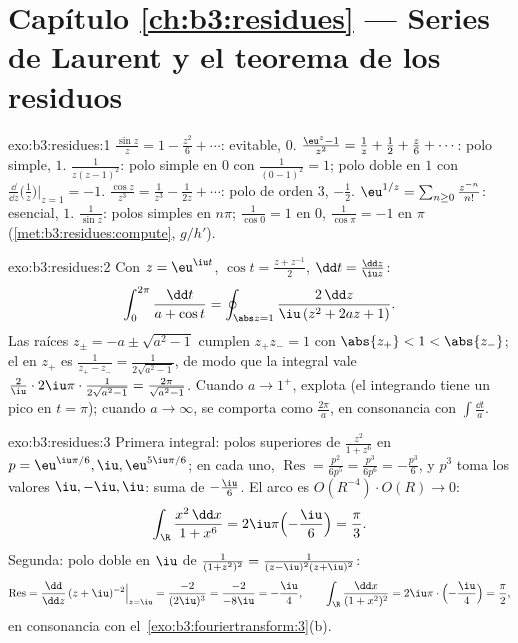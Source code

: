 \section*{Capítulo \ref{ch:b3:residues} --- Series de Laurent y
el teorema de los residuos}

\begin{solution}{exo:b3:residues:1}
$\frac{\sin z}z = 1 - \frac{z^2}6 + \cdots$: evitable,
 $0$.
$\frac{\eu^z - 1}{z^2} = \frac1z + \frac12 +
\frac z6 + \cdots$: polo simple,
 $1$. $\frac1{z(z-1)^2}$:
polo simple en $0$ con 
$\frac1{(0-1)^2} = 1$; polo doble en $1$ con
$\frac{\dd}{\dd z}\bigl(\frac1z\bigr)\big|_{z=1} = -1$.
$\frac{\cos z}{z^3} = \frac1{z^3} - \frac1{2z} + \cdots$: polo de orden
$3$,  $-\frac12$.
$\eu^{1/z} = \sum_{n\geq0}
\frac{z^{-n}}{n!}$: esencial,
 $1$. $\frac1{\sin z}$:
polos simples en $n\pi$; 
$\frac1{\cos 0} = 1$ en $0$, $\frac1{\cos\pi} = -1$ en $\pi$
(\cref{met:b3:residues:compute}, $g/h'$).
\end{solution}

\begin{solution}{exo:b3:residues:2}
Con $z = \eu^{\iu t}$, $\cos t = \frac{z + z^{-1}}2$, $\dd t
= \frac{\dd z}{\iu z}$:
\[
\int_0^{2\pi}\frac{\dd t}{a + \cos t}
= \oint_{\abs z = 1}\frac{2\,\dd z}{\iu\,(z^2 + 2az + 1)} .
\]
Las raíces $z_\pm = -a \pm \sqrt{a^2 - 1}$ cumplen $z_+z_- =
1$ con $\abs{z_+} < 1 < \abs{z_-}$; el
 en $z_+$ es
$\frac{1}{z_+ - z_-} = \frac1{2\sqrt{a^2-1}}$, de modo que la integral
vale $\frac2\iu\cdot2\iu\pi\cdot\frac1{2\sqrt{a^2-1}} =
\frac{2\pi}{\sqrt{a^2-1}}$. Cuando $a \to 1^+$, explota (el integrando
tiene un pico en $t = \pi$); cuando $a \to \infty$, se comporta como
$\frac{2\pi}a$, en consonancia con $\int\frac{\dd t}a$.
\end{solution}

\begin{solution}{exo:b3:residues:3}
Primera integral: polos superiores de $\frac{z^2}{1+z^6}$ en $p =
\eu^{\iu\pi/6}, \iu, \eu^{5\iu\pi/6}$; en cada uno,
$\operatorname{Res} = \frac{p^2}{6p^5} = \frac{p^3}{6p^6} =
-\frac{p^3}6$, y $p^3$ toma los valores $\iu, -\iu, \iu$: suma de
 $-\frac{\iu}{6}$. El
arco es
$O(R^{-4})\cdot O(R) \to 0$:
\[
\int_\R\frac{x^2\,\dd x}{1 + x^6} =
2\iu\pi\Bigl(-\frac \iu6\Bigr) = \frac\pi3 .
\]
Segunda: polo doble en $\iu$ de $\frac1{(1+z^2)^2} =
\frac1{(z-\iu)^2(z+\iu)^2}$:
\[
\operatorname{Res} = \frac{\dd}{\dd z}\,(z +
\iu)^{-2}\Big|_{z=\iu} = \frac{-2}{(2\iu)^3} =
\frac{-2}{-8\iu} = -\frac\iu4,
\qquad
\int_\R\frac{\dd x}{(1+x^2)^2} =
2\iu\pi\cdot\Bigl(-\frac\iu4\Bigr) = \frac\pi2 ,
\]
en consonancia con el~\cref{exo:b3:fouriertransform:3}(b).
\end{solution}

